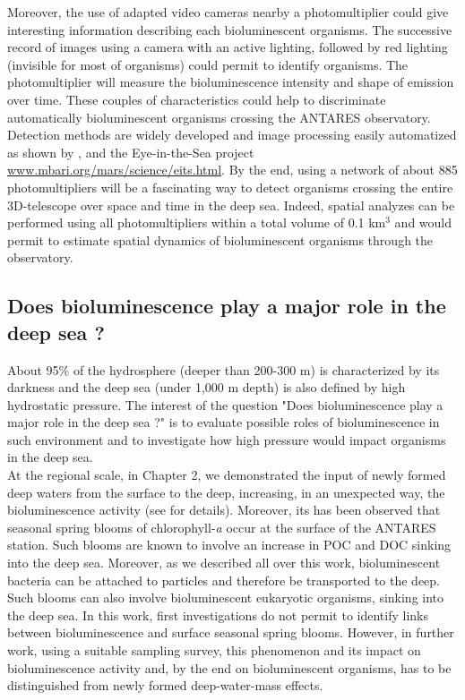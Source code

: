 Moreover, the use of adapted video cameras nearby a photomultiplier could give interesting information describing each bioluminescent organisms. The successive record of images using a camera with an active lighting, followed by red lighting (invisible for most of organisms) could permit to identify organisms. The photomultiplier will measure the bioluminescence intensity and shape of emission over time. These couples of characteristics could help to discriminate automatically bioluminescent organisms crossing the ANTARES observatory. Detection methods are widely developed and image processing easily automatized as shown by \cite{stemmann2008}, \cite{aguzzi2009} and the Eye-in-the-Sea project \underline{www.mbari.org/mars/science/eits.html}. By the end, using a network of about 885 photomultipliers will be a fascinating way to detect organisms crossing the entire 3D-telescope over space and time in the deep sea. Indeed, spatial analyzes can be performed using all photomultipliers within a total volume of 0.1 km$^3$ and would permit to estimate spatial dynamics of bioluminescent organisms through the observatory. \\ 

\subsection{Does bioluminescence play a major role in the deep sea ?}

About 95\% of the hydrosphere (deeper than 200-300 m) is characterized by its darkness and the deep sea (under 1,000 m depth) is also defined by high hydrostatic pressure. The interest of the question "Does bioluminescence play a major role in the deep sea ?" is to evaluate possible roles of bioluminescence in such environment and to investigate how high pressure would impact organisms in the deep sea.\\

At the regional scale, in Chapter 2, we demonstrated the input of newly formed deep waters from the surface to the deep, increasing, in an unexpected way, the bioluminescence activity (see \cite{tamburini2013} for details). Moreover, its has been observed that seasonal spring blooms of chlorophyll-\textit{a} occur at the surface of the ANTARES station. Such blooms are known to involve an increase in POC and DOC sinking into the deep sea. Moreover, as we described all over this work, bioluminescent bacteria can be attached to particles and therefore be transported to the deep. Such blooms can also involve bioluminescent eukaryotic organisms, sinking into the deep sea. In this work, first investigations do not permit to identify links between bioluminescence and surface seasonal spring blooms. However, in further work, using a suitable sampling survey, this phenomenon and its impact on bioluminescence activity and, by the end on bioluminescent organisms, has to be distinguished from newly formed deep-water-mass effects.\\

